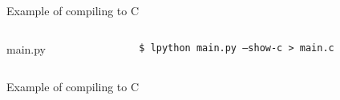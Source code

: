 \begin{frame}{Example of compiling to C}
    \begin{columns}
        \begin{column}{0.5\textwidth}
            \tiny
            
            \centering main.py
        \end{column}
        \begin{column}{0.5\textwidth}
            \texttt{\$ lpython main.py --show-c > main.c}
        \end{column}
    \end{columns}
\end{frame}

\begin{frame}{Example of compiling to C}
    \tiny
    \begin{columns}
        \begin{column}{0.5\textwidth}
            
        \end{column}
        \begin{column}{0.5\textwidth}
            
        \end{column}
    \end{columns}
\end{frame}